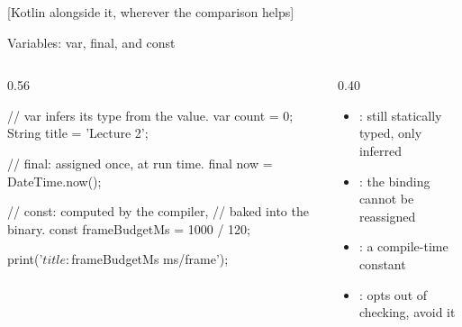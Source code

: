 \documentclass[10pt,aspectratio=169,t]{beamer}
\begin{document}
[Kotlin alongside it, wherever the comparison helps]

\begin{frame}[fragile,eyebrow=Dart]{Variables: var, final, and const}
  \begin{columns}[T]
    \begin{column}{0.56\textwidth}
\begin{dart}
// var infers its type from the value.
var count = 0;
String title = 'Lecture 2';

// final: assigned once, at run time.
final now = DateTime.now();

// const: computed by the compiler,
// baked into the binary.
const frameBudgetMs = 1000 / 120;

print('$title: $frameBudgetMs ms/frame');
\end{dart}
    \end{column}
    \begin{column}{0.40\textwidth}
      \begin{itemize}
        \item {}: still statically typed, only inferred
        \item {}: the binding cannot be reassigned
        \item {}: a compile-time constant
        \item {}: opts out of checking, avoid it
      \end{itemize}
    \end{column}
  \end{columns}
\end{frame}
\end{document}
